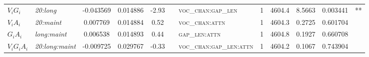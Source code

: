 \begin{table}
\begin{tabular}{ l >{\itshape}l S S S[round-precision=2] c >{\scshape}l c S[round-precision=1,table-format=4.1] S[round-precision=2] S[round-minimum=0.001,table-format=>1.3] c }
	$V_i G_i$         & 20:long          &  -0.043569                   & 0.014886               &  -2.93                  & & voc\_chan:gap\_len      & 1   & 4604.4                  &  8.5663                 &  0.003441               & **      \\
	$V_i A_i$         & 20:maint         &   0.007769                   & 0.014884               &   0.52                  & & voc\_chan:attn          & 1   & 4604.3                  &  0.2725                 &  0.601704               &         \\
	$G_i A_i$         & long:maint       &   0.006538                   & 0.014893               &   0.44                  & & gap\_len:attn           & 1   & 4604.8                  &  0.1927                 &  0.660708               &         \\
	$V_i G_i A_i$     & 20:long:maint    &  -0.009725                   & 0.029767               &  -0.33                  & & voc\_chan:gap\_len:attn & 1   & 4604.2                  &  0.1067                 &  0.743904               &         \\ \bottomrule
\end{tabular}
\end{table}
\cleardoublepage \eject \pdfpagewidth=8.5in \pdfpageheight=11in \restoregeometry \doublespacing
